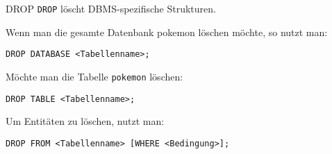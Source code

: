 \begin{sql}{DROP}
    \texttt{DROP} löscht DBMS-spezifische Strukturen.

    Wenn man die gesamte Datenbank pokemon löschen möchte, so nutzt man:

    \begin{lstlisting}[language=mysql]
        DROP DATABASE <Tabellenname>;
    \end{lstlisting}

    Möchte man die Tabelle \texttt{pokemon} löschen:

    \begin{lstlisting}[language=mysql]
        DROP TABLE <Tabellenname>;
    \end{lstlisting}

    Um Entitäten zu löschen, nutzt man:

    \begin{lstlisting}[language=mysql]
        DROP FROM <Tabellenname> [WHERE <Bedingung>];
    \end{lstlisting}
\end{sql}

